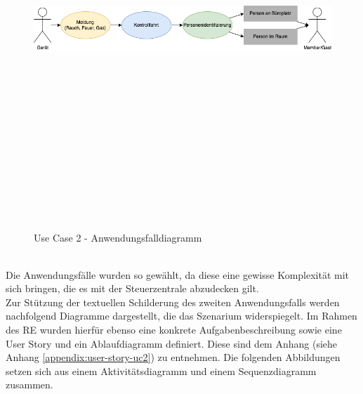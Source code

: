     \begin{figure}[hbt!]
        \centering
        \includegraphics[width=15cm,height=15cm,keepaspectratio]{images/UC2_Diagramm_Notfall.png}
        \caption{Use Case 2 - Anwendungsfalldiagramm}
        \label{fig:uc2-emergency}
    \end{figure}
    \\
    Die Anwendungsfälle wurden so gewählt, da diese eine gewisse Komplexität mit sich bringen, die es mit der Steuerzentrale 
    abzudecken gilt.
    \\
    \linebreak
    Zur Stützung der textuellen Schilderung des zweiten Anwendungsfalls werden nachfolgend Diagramme dargestellt, die das Szenarium 
    widerspiegelt. Im Rahmen des \acs{RE} wurden hierfür ebenso eine konkrete Aufgabenbeschreibung sowie eine User Story und ein Ablaufdiagramm definiert. Diese sind dem 
    Anhang (siehe Anhang \ref{appendix:user-story-uc2}) zu entnehmen. Die folgenden Abbildungen setzen sich aus einem 
    Aktivitätsdiagramm und einem Sequenzdiagramm zusammen. %
    